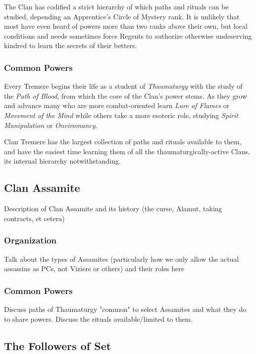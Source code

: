 The Clan has codified a strict hierarchy of which paths and rituals can be studied, depending 
an Apprentice's Circle of Mystery rank.  It is unlikely that most have even heard of powers 
more than two ranks above their own, but local conditions and needs sometimes force 
Regents to authorize otherwise undeserving kindred to learn the secrets of their betters.

\subsubsection{Common Powers}
Every Tremere begins their life as a student of \emph{Thaumaturgy} with the study of the \emph{Path of Blood}, 
from which the core of the Clan's power stems.  As they grow and advance many who are more 
combat-oriented learn \emph{Lure of Flames} or \emph{Movement of the Mind} while others 
take a more esoteric role, studying \emph{Spirit Manipulation} or \emph{Oneiromancy}.

Clan Tremere has the largest collection of paths and rituals available to them, and have the 
easiest time learning them of all the thaumaturgically-active Clans, its internal hierarchy notwithstanding.


\subsection{Clan Assamite}
\label{sec:assamite}
Description of Clan Assamite and its history (the curse, Alamut, taking contracts, et cetera)

\subsubsection{Organization}
Talk about the types of Assamites (particularly how we only allow the actual assassins as PCs, 
not Viziers or others) and their roles here

\subsubsection{Common Powers}
Discuss paths of Thaumaturgy "common" to select Assamites and what they do to share powers.  
Discuss the rituals available/limited to them.


\subsection{The Followers of Set}
\label{sec:settite}

